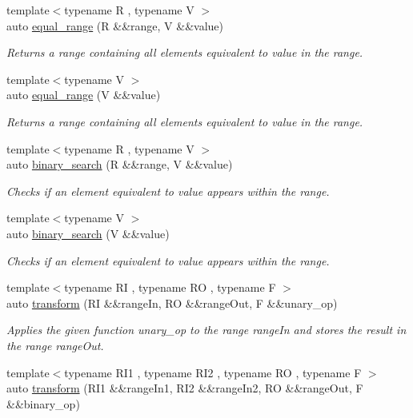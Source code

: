 \begin{DoxyCompactItemize}
{\footnotesize template$<$typename R , typename V $>$ }\\auto \mbox{\hyperlink{namespacerah_a095c61033422b8ebe6dc2cc214867aca}{equal\+\_\+range}} (R \&\&range, V \&\&value)
\begin{DoxyCompactList}\small\item\em Returns a range containing all elements equivalent to value in the range. \end{DoxyCompactList}\item 
{\footnotesize template$<$typename V $>$ }\\auto \mbox{\hyperlink{namespacerah_afa191bbe5b7dbb9b2e7a21a87dbb9a8a}{equal\+\_\+range}} (V \&\&value)
\begin{DoxyCompactList}\small\item\em Returns a range containing all elements equivalent to value in the range. \end{DoxyCompactList}\item 
{\footnotesize template$<$typename R , typename V $>$ }\\auto \mbox{\hyperlink{namespacerah_a5eef379d9f3039fd12f43d5220434976}{binary\+\_\+search}} (R \&\&range, V \&\&value)
\begin{DoxyCompactList}\small\item\em Checks if an element equivalent to value appears within the range. \end{DoxyCompactList}\item 
{\footnotesize template$<$typename V $>$ }\\auto \mbox{\hyperlink{namespacerah_a8ac532c28d2c52c80adf91a7b8829bd6}{binary\+\_\+search}} (V \&\&value)
\begin{DoxyCompactList}\small\item\em Checks if an element equivalent to value appears within the range. \end{DoxyCompactList}\item 
{\footnotesize template$<$typename RI , typename RO , typename F $>$ }\\auto \mbox{\hyperlink{namespacerah_a7cb27bf7219a7ee4b47cc9da217810a8}{transform}} (RI \&\&range\+In, RO \&\&range\+Out, F \&\&unary\+\_\+op)
\begin{DoxyCompactList}\small\item\em Applies the given function unary\+\_\+op to the range range\+In and stores the result in the range range\+Out. \end{DoxyCompactList}\item 
{\footnotesize template$<$typename R\+I1 , typename R\+I2 , typename RO , typename F $>$ }\\auto \mbox{\hyperlink{namespacerah_a7bac191e66e0d3f3823e0c08382f0418}{transform}} (R\+I1 \&\&range\+In1, R\+I2 \&\&range\+In2, RO \&\&range\+Out, F \&\&binary\+\_\+op)

\end{DoxyCompactItemize}
